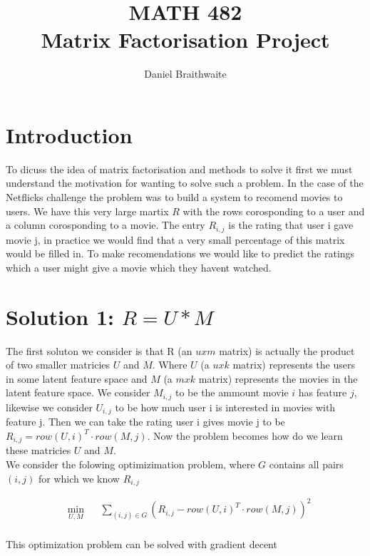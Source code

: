 \documentclass{article}
\title{%
	MATH 482\\
	\large Matrix Factorisation Project
}
\author{Daniel Braithwaite}
\begin{document}
\maketitle

\section{Introduction}
To dicuss the idea of matrix factorisation and methods to solve it first we must understand the motivation for wanting to solve such a problem. In the case of the Netflicks challenge the problem was to build a system to recomend movies to users. We have this very large martix $R$ with the rows corosponding to a user and a column corosponding to a movie. The entry $R_{i,j}$ is the rating that user i gave movie j, in practice we would find that a very small percentage of this matrix would be filled in. To make recomendations we would like to predict the ratings which a user might give a movie which they havent watched.\\

\section{Solution 1: $R = U * M$}
The first soluton we consider is that R (an $u x m$ matrix) is actually the product of two smaller matricies $U$ and $M$. Where $U$ (a $u x k$ matrix) represents the users in some latent feature space and $M$ (a $m x k$ matrix) represents the movies in the latent feature space. We consider $M_{i,j}$ to be the ammount movie $i$ has feature $j$, likewise we consider $U_{i,j}$ to be how much user i is interested in movies with feature j. Then we can take the rating user i gives movie j to be $R_{i,j} = row(U, i)^T \cdot row(M, j)$. Now the problem becomes how do we learn these matricies $U$ and $M$.\\

We consider the folowing optimizimation problem, where $G$ contains all pairs $(i,j)$ for which we know $R_{i,j}$

\begin{equation*}
\begin{aligned}
& \underset{U, M}{\text{min}}
& & \sum_{(i,j) \in G} (R_{i,j} - row(U, i)^T \cdot row(M, j))^2  \\
\end{aligned}
\end{equation*}

This optimization problem can be solved with gradient decent
\end{document}
